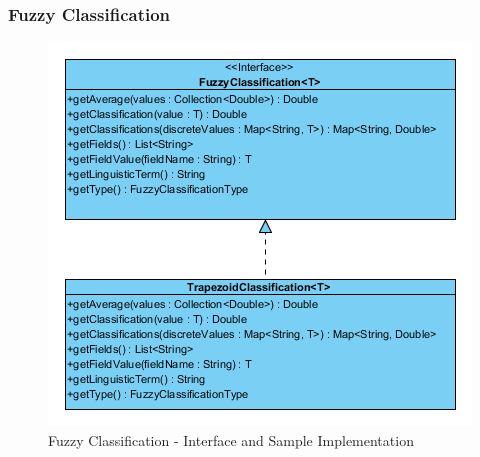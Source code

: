 \documentclass[a4paper]{article}
\begin{document}
\subsubsection{Fuzzy Classification}
\begin{figure}[h]
	\centering
	\includegraphics[scale=2.5]{images/uml_fuzzy.png}
	\caption{Fuzzy Classification - Interface and Sample Implementation}
	\label{uml_fuzzy}
\end{figure}
\end{document}
